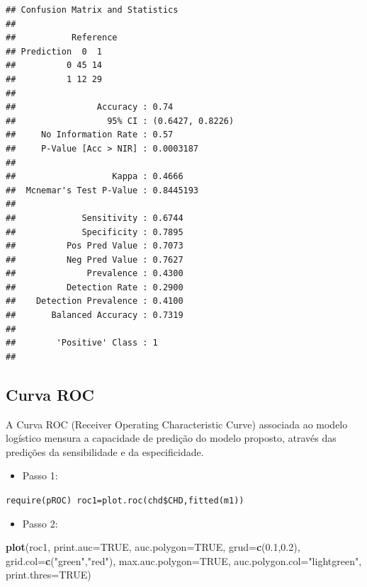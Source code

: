\documentclass[12pt,brazil,]{book}
\newenvironment{Shaded}{\begin{snugshade}}{\end{snugshade}}
\newcommand{\DataTypeTok}[1]{\textcolor[rgb]{0.13,0.29,0.53}{#1}}
\newcommand{\FloatTok}[1]{\textcolor[rgb]{0.00,0.00,0.81}{#1}}
\newcommand{\KeywordTok}[1]{\textcolor[rgb]{0.13,0.29,0.53}{\textbf{#1}}}
\newcommand{\NormalTok}[1]{#1}
\newcommand{\OtherTok}[1]{\textcolor[rgb]{0.56,0.35,0.01}{#1}}
\newcommand{\StringTok}[1]{\textcolor[rgb]{0.31,0.60,0.02}{#1}}
\providecommand{\tightlist}{%
  \setlength{\itemsep}{0pt}\setlength{\parskip}{0pt}}
\begin{document}
\begin{verbatim}
## Confusion Matrix and Statistics
## 
##           Reference
## Prediction  0  1
##          0 45 14
##          1 12 29
##                                           
##                Accuracy : 0.74            
##                  95% CI : (0.6427, 0.8226)
##     No Information Rate : 0.57            
##     P-Value [Acc > NIR] : 0.0003187       
##                                           
##                   Kappa : 0.4666          
##  Mcnemar's Test P-Value : 0.8445193       
##                                           
##             Sensitivity : 0.6744          
##             Specificity : 0.7895          
##          Pos Pred Value : 0.7073          
##          Neg Pred Value : 0.7627          
##              Prevalence : 0.4300          
##          Detection Rate : 0.2900          
##    Detection Prevalence : 0.4100          
##       Balanced Accuracy : 0.7319          
##                                           
##        'Positive' Class : 1               
## 
\end{verbatim}

\hypertarget{curva-roc}{%
\subsection{Curva ROC}\label{curva-roc}}

A Curva ROC (Receiver Operating Characteristic Curve) associada ao
modelo logístico mensura a capacidade de predição do modelo proposto,
através das predições da sensibilidade e da especificidade.

\begin{itemize}
\tightlist
\item
  Passo 1:
\end{itemize}

\texttt{require(pROC)\ roc1=plot.roc(chd\$CHD,fitted(m1))}

\begin{itemize}
\tightlist
\item
  Passo 2:
\end{itemize}

\begin{Shaded}
\begin{Highlighting}[]
\KeywordTok{plot}\NormalTok{(roc1,}
     \DataTypeTok{print.auc=}\OtherTok{TRUE}\NormalTok{, }
     \DataTypeTok{auc.polygon=}\OtherTok{TRUE}\NormalTok{, }
     \DataTypeTok{grud=}\KeywordTok{c}\NormalTok{(}\FloatTok{0.1}\NormalTok{,}\FloatTok{0.2}\NormalTok{),}
     \DataTypeTok{grid.col=}\KeywordTok{c}\NormalTok{(}\StringTok{"green"}\NormalTok{,}\StringTok{"red"}\NormalTok{), }
     \DataTypeTok{max.auc.polygon=}\OtherTok{TRUE}\NormalTok{, }
     \DataTypeTok{auc.polygon.col=}\StringTok{"lightgreen"}\NormalTok{, }
     \DataTypeTok{print.thres=}\OtherTok{TRUE}\NormalTok{)}
\end{Highlighting}
\end{Shaded}
\end{document}
